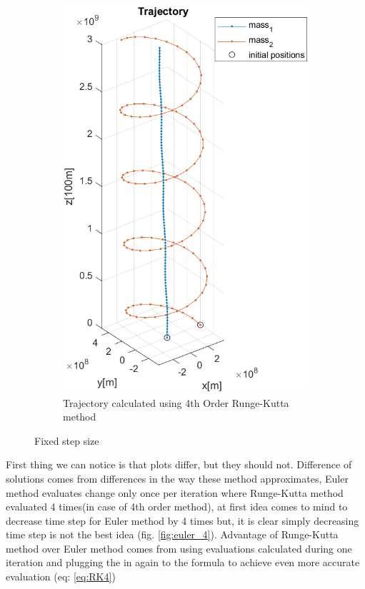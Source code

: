 \documentclass[english,12pt,a4paper, notitlepage]{report}
\begin{document}
\begin{figure}[h!]
\begin{subfigure}[b]{0.4\textwidth}
			\includegraphics[height=0.3\textheight]{trj_RK4.png}
			\caption{Trajectory calculated using 4th Order Runge-Kutta method}
		\end{subfigure}
		\caption{Fixed step size}
	\end{figure}
	
	First thing we can notice is that plots differ, but they should not. Difference of solutions comes from differences in the way these method approximates, Euler method evaluates change only once per iteration where Runge-Kutta method evaluated 4 times(in case of 4th order method), at first idea comes to mind to decrease time step for Euler method by 4 times but, it is clear simply decreasing time step is not the best idea (fig. \ref{fig:euler_4}). Advantage of Runge-Kutta method over Euler method comes from using evaluations calculated during one iteration and plugging the in again to the formula to achieve even more accurate evaluation (eq: \ref{eq:RK4}) 
	
\end{document}
